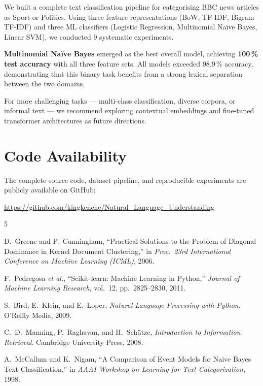 \documentclass[conference, 10pt]{IEEEtran}
\begin{document}
We built a complete text classification pipeline for categorising BBC news articles as Sport or Politics.
Using three feature representations (BoW, TF-IDF, Bigram TF-IDF) and three ML classifiers (Logistic Regression, Multinomial Na\"ive Bayes, Linear SVM), we conducted 9 systematic experiments.

\textbf{Multinomial Na\"ive Bayes} emerged as the best overall model, achieving \textbf{100\,\% test accuracy} with all three feature sets.
All models exceeded 98.9\,\% accuracy, demonstrating that this binary task benefits from a strong lexical separation between the two domains.

For more challenging tasks --- multi-class classification, diverse corpora, or informal text --- we recommend exploring contextual embeddings and fine-tuned transformer architectures as future directions.


\section{Code Availability}

The complete source code, dataset pipeline, and reproducible experiments are publicly available on GitHub:

\begin{center}
\url{https://github.com/kingkenche/Natural_Language_Understanding}
\end{center}


\begin{thebibliography}{5}

D.~Greene and P.~Cunningham,
``Practical Solutions to the Problem of Diagonal Dominance in Kernel Document Clustering,''
in \emph{Proc.\ 23rd International Conference on Machine Learning (ICML)}, 2006.

F.~Pedregosa \emph{et al.},
``Scikit-learn: Machine Learning in Python,''
\emph{Journal of Machine Learning Research}, vol.~12, pp.~2825--2830, 2011.

S.~Bird, E.~Klein, and E.~Loper,
\emph{Natural Language Processing with Python}.
O'Reilly Media, 2009.

C.~D.~Manning, P.~Raghavan, and H.~Sch\"utze,
\emph{Introduction to Information Retrieval}.
Cambridge University Press, 2008.

A.~McCallum and K.~Nigam,
``A Comparison of Event Models for Naive Bayes Text Classification,''
in \emph{AAAI Workshop on Learning for Text Categorization}, 1998.

\end{thebibliography}
\end{document}
